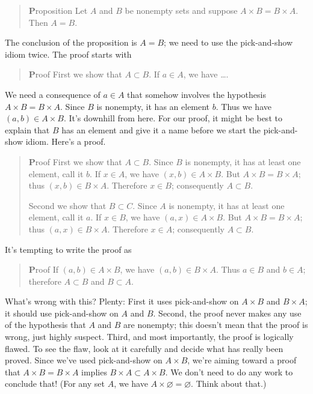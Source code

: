 \documentclass[12pt,fleqn]{article}
\newcounter{ex}\setcounter{ex}{0}
\newcounter{id}\setcounter{id}{0}
\newcounter{se}\setcounter{se}{0}
\begin{document}
\begin{quote}
{ \textbf Proposition} Let \(A\) and \(B\) be nonempty sets and suppose \mbox{\(A \times B
= B \times A\)}.  Then \(A = B\).
\end{quote}
The conclusion of the proposition is \(A = B\); we need to use the 
pick-and-show idiom twice. The proof starts with
\begin{quote}
 { \textbf Proof}  First we show that \(A \subset B\). If \(a \in A\), we have \dots. 
\end{quote}
We need a consequence of \(a \in A\) that somehow involves the
hypothesis \mbox{\(A \times B = B \times A\)}.  Since \(B\) is
nonempty, it has an element \(b\). Thus we have \((a,b) \in A \times
B\).  It's downhill from here. For our proof, it might be best to
explain that \(B\) has an element and give it a name before we start
the pick-and-show idiom.  Here's a proof.



\begin{quote}
 { \textbf Proof} First we show that \(A \subset B\). Since \(B\) is
 nonempty, it has at least one element, call it \(b\). If \(x \in A\), we
 have \((x,b) \in A \times B\).  But \mbox{\(A \times B = B \times A\)};
 thus \((x,b) \in B \times A\).  Therefore \(x \in B\); consequently
\(A \subset B\).

Second we show that \(B \subset C\).  Since \(A\) is
 nonempty, it has at least one element, call it \(a\). If \(x \in B\), we
 have \((a,x) \in A \times B\).  But \(A \times B = B \times A\);
 thus \((a,x) \in B \times A\).  Therefore \(x \in A\); consequently
\(A \subset B\).

\end{quote}


It's tempting to write the proof as

\begin{quote}
 { \textbf Proof} If \((a,b) \in A \times B\), we have \((a,b) \in B \times
 A\). Thus \(a \in B\) and \(b \in A\); therefore \(A \subset B\) and
\(B \subset A\).
\end{quote}

What's wrong with this? Plenty: First it uses pick-and-show on \(A
\times B\) and \(B \times A\); it should use pick-and-show on \(A\)
and \(B\). Second, the proof never makes any use of the hypothesis
that \(A\) and \(B\) are nonempty; this doesn't mean that the proof is
wrong, just highly suspect. Third, and most importantly, the proof is
logically flawed. To see the flaw, look at it carefully and decide
what has really been proved. Since we've used pick-and-show on \(A
\times B\), we're aiming toward a proof that  \(A \times B = B
\times A\) implies \(B \times A \subset A \times B\).  We don't need
to do any work to conclude that! (For any set \(A\), we have \(A
\times \varnothing = \varnothing\). Think about that.)
\end{document}
